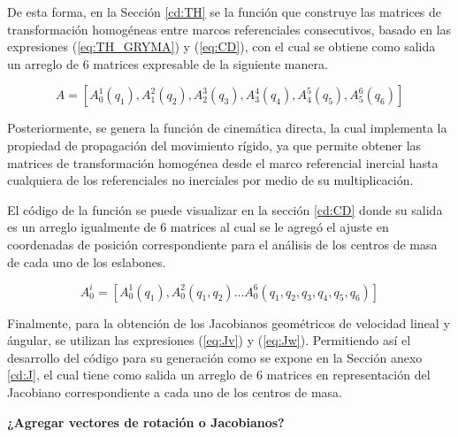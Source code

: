     De esta forma, en la Sección \ref{cd:TH} se la función que construye  
    las matrices de transformación homogéneas entre marcos referenciales consecutivos, basado 
    en las expresiones (\ref{eq:TH_GRYMA}) y (\ref{eq:CD}), con el cual se obtiene como salida un arreglo de 6 matrices 
    expresable de la siguiente manera.

    \begin{equation*}
        A = [A^1_0(q_1), A^2_1(q_2), A^3_2(q_3), A^4_3(q_4), A^5_4(q_5), A^6_5(q_6)]
    \end{equation*}

    Posteriormente, se genera la función 
    de cinemática directa, la cual implementa la propiedad de propagación del movimiento 
    rígido, ya que permite obtener las matrices de transformación homogénea desde el marco 
    referencial inercial hasta cualquiera de los referenciales no inerciales por medio de su multiplicación. 

    El código de la función se puede visualizar en la sección \ref{cd:CD} donde su salida es un arreglo igualmente de 
    6 matrices al cual se le agregó el ajuste en coordenadas de posición correspondiente para 
    el análisis de los centros de masa de cada uno de los eslabones.

    \begin{equation*}
        A^i_0 = [A^1_0(q_1), A^2_0(q_1,q_2)...A^6_0(q_1,q_2,q_3,q_4,q_5,q_6)]
    \end{equation*}

    Finalmente, para la obtención de los Jacobianos geométricos de velocidad lineal y ángular, 
    se utilizan las expresiones (\ref{eq:Jv}) y (\ref{eq:Jw}). Permitiendo así el desarrollo del código para su
    generación como se expone en la Sección anexo \ref{cd:J}, el cual tiene como salida un arreglo de 6 matrices en
    representación del Jacobiano correspondiente a cada uno de los centros de masa.

    \textbf{¿Agregar vectores de rotación o Jacobianos?}


